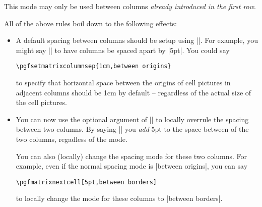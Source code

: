 \begin{command}{\pgfmatrixnextcell{}}
\begin{itemize}
    This mode may only be used between columns \emph{already
      introduced in the first row}. 
  \end{itemize}
  All of the above rules boil down to the following effects:
  \begin{itemize}
  \item A default spacing between columns should be setup using
    |\pgfsetmatrixcolumnsep|. For example, you might say
    |\pgfsetmatrixcolumnsep{5pt}| to have columns be spaced apart by
    |5pt|. You could say
\begin{verbatim}
\pgfsetmatrixcolumnsep{1cm,between origins}
\end{verbatim}
    to specify that horizontal space between the origins of cell
    pictures in adjacent columns should be 1cm by default --
    regardless of the actual size of the cell pictures.
  \item You can now use the optional argument of |\pgfmatrixnextcell|
    to locally overrule the spacing between two columns. By saying
    |\pgfmatrixnextcell[5pt]| you \emph{add} 5pt to the space between
    of the two columns, regadless of the mode.

    You can also (locally) change the spacing mode for these two
    columns. For example, even if the normal spacing mode is
    |between origins|, you can say
\begin{verbatim}
\pgfmatrixnextcell[5pt,between borders]
\end{verbatim}
    to locally change the mode for these columns to
    |between borders|.
  \end{itemize}


\end{command}
